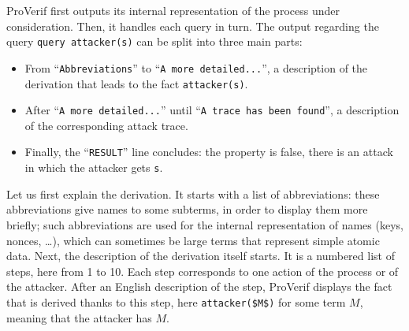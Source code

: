 \documentclass{book}
\begin{document}
ProVerif first outputs its internal representation of the process under consideration.
Then, it handles each query in turn. The output regarding the query \lstinline!query attacker(s)!
can be split into three main parts:
\begin{itemize}
\item From ``\lstinline!Abbreviations!'' to ``\lstinline!A more detailed...!'', a description of the derivation
that leads to the fact \lstinline!attacker(s)!.
\item After ``\lstinline!A more detailed...!'' until ``\lstinline!A trace has been found!'', a description
of the corresponding attack trace.
\item Finally, the ``\lstinline!RESULT!'' line concludes: the property is false, there is an attack
in which the attacker gets \lstinline!s!.
\end{itemize}
Let us first explain the derivation. It starts with a list of abbreviations: these abbreviations give names to some subterms, in order to display them more briefly; such abbreviations are used for the internal representation of names (keys, nonces, \ldots), which can sometimes be large terms that represent simple atomic data. Next, the description of the derivation itself starts. It is a numbered list of steps, here from 1 to 10. Each step corresponds to one action of the process or of the attacker. After an English description of the step, ProVerif displays the fact that is derived thanks to this step, here \lstinline!attacker($M$)! for some term $M$, meaning that the attacker has $M$.
\end{document}
